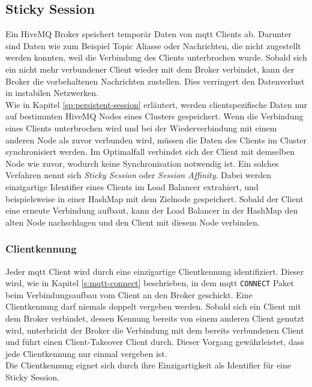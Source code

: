 \subsection{Sticky Session} \label{ss:sticky-session}
Ein HiveMQ Broker speichert temporär Daten von \ac{mqtt} Clients ab. Darunter sind Daten wie zum Beispiel Topic Aliasse oder Nachrichten, die nicht zugestellt werden konnten, weil die Verbindung des Clients unterbrochen wurde.
Sobald sich ein nicht mehr verbundener Client wieder mit dem Broker verbindet, kann der Broker die vorbehaltenen Nachrichten zustellen.
Dies verringert den Datenverlust in instabilen Netzwerken.
\\
Wie in Kapitel \ref{sp:persistent-session} erläutert, werden clientspezifische Daten nur auf bestimmten HiveMQ Nodes eines Clusters gespeichert.
Wenn die Verbindung eines Clients unterbrochen wird und bei der Wiederverbindung mit einem anderen Node als zuvor verbunden wird, müssen die Daten des Clients im Cluster synchronisiert werden.
Im Optimalfall verbindet sich der Client mit demselben Node wie zuvor, wodurch keine Synchronisation notwendig ist.
Ein solches Verfahren nennt sich \textit{Sticky Session} oder \textit{Session Affinity}. Dabei werden einzigartige Identifier eines Clients im Load Balancer extrahiert, und beispielsweise in einer HashMap mit dem Zielnode gespeichert. Sobald der Client eine erneute Verbindung aufbaut, kann der Load Balancer in der HashMap den alten Node nachschlagen und den Client mit diesem Node verbinden. \cite{WhatDoesTerm}

\subsubsection{Clientkennung} \label{ss:clientid}
Jeder \ac{mqtt} Client wird durch eine einzigartige Clientkennung identifiziert. Dieser wird, wie in Kapitel \ref{s:mqtt-connect} beschrieben, in dem \ac{mqtt} \verb|CONNECT| Paket beim Verbindungsaufbau vom Client an den Broker geschickt.
Eine Clientkennung darf niemals doppelt vergeben werden. Sobald sich ein Client mit dem Broker verbindet, dessen Kennung bereits von einem anderen Client genutzt wird, unterbricht der Broker die Verbindung mit dem bereits verbundenen Client und führt einen Client-Takeover Client durch.
Dieser Vorgang gewährleistet, dass jede Clientkennung nur einmal vergeben ist.
\\
Die Clientkennung eignet sich durch ihre Einzigartigkeit als Identifier für eine Sticky Session.

